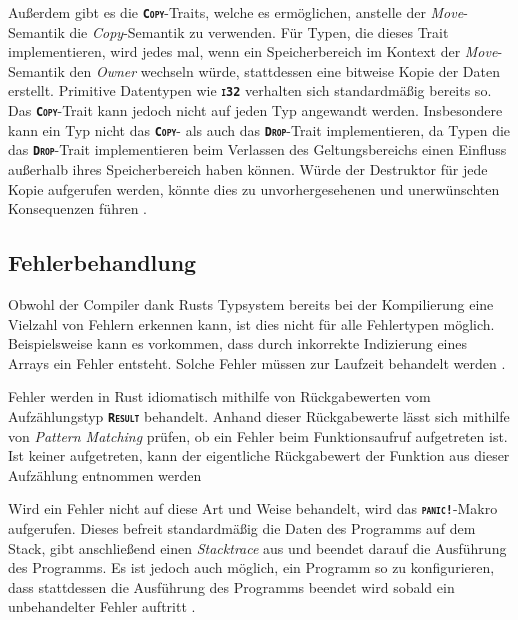 Außerdem gibt es die \texttt{\textsc{\textbf{Copy}}}-Traits, welche es ermöglichen, anstelle der \textit{Move}-Semantik die
\textit{Copy}-Semantik zu verwenden. Für Typen, die dieses Trait implementieren, wird jedes mal, wenn ein
Speicherbereich im Kontext der \textit{Move}-Semantik den \textit{Owner} wechseln würde,
stattdessen eine bitweise Kopie der Daten erstellt. Primitive Datentypen wie \texttt{\textsc{\textbf{i32}}}
verhalten sich standardmäßig bereits so. Das \texttt{\textsc{\textbf{Copy}}}-Trait kann jedoch nicht auf jeden Typ
angewandt werden.
Insbesondere kann ein Typ nicht das \texttt{\textsc{\textbf{Copy}}}- als auch  das \texttt{\textsc{\textbf{Drop}}}-Trait implementieren,
da Typen die das \texttt{\textsc{\textbf{Drop}}}-Trait implementieren beim Verlassen des Geltungsbereichs einen Einfluss außerhalb ihres
Speicherbereich haben können.
Würde der Destruktor für jede Kopie aufgerufen werden, könnte dies zu unvorhergesehenen und
unerwünschten Konsequenzen führen \cite{rustBook}\cite{rustDocCopy}.

\subsection{Fehlerbehandlung}\label{sec:error_handling}

Obwohl der Compiler dank Rusts Typsystem bereits bei der Kompilierung eine Vielzahl von Fehlern erkennen kann,
ist dies nicht für alle Fehlertypen möglich. Beispielsweise kann es vorkommen, dass
durch inkorrekte Indizierung eines Arrays ein Fehler entsteht.
Solche Fehler müssen zur Laufzeit behandelt werden \cite{rustBook}.

Fehler werden in Rust idiomatisch mithilfe von Rückgabewerten vom Aufzählungstyp \texttt{\textsc{\textbf{Result}}}
behandelt. Anhand dieser Rückgabewerte lässt sich mithilfe von
\textit{Pattern Matching} prüfen, ob ein Fehler beim Funktionsaufruf aufgetreten ist. Ist keiner aufgetreten,
kann der eigentliche Rückgabewert der Funktion aus dieser Aufzählung entnommen werden
\cite{rustBook}

Wird ein Fehler nicht auf diese Art und Weise behandelt, wird das \texttt{\textsc{\textbf{panic!}}}-Makro
aufgerufen. Dieses befreit standardmäßig die Daten des Programms auf dem Stack, gibt anschließend einen
\textit{Stacktrace} aus und beendet darauf die Ausführung des Programms.
Es ist jedoch auch möglich, ein Programm so zu konfigurieren,
dass stattdessen die Ausführung des Programms beendet wird sobald ein unbehandelter Fehler auftritt \cite{rustBook}.

